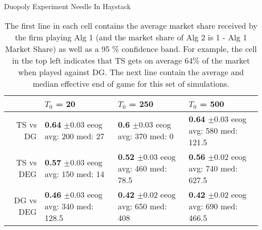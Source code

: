 \documentclass[../competing_bandits.tex]{subfiles}
\begin{document}
\begin{table}[ht]
\centering
\caption{Duopoly Experiment Needle In Haystack}
\begin{tabular}{rlll}
  \hline
 & $T_0$ = 20 & $T_0$ = 250 & $T_0$ = 500 \\
  \hline
TS vs DG & \makecell{\textbf{0.64} $\pm$0.03\\ eeog \\ avg: 200\\ med: 27} & \makecell{\textbf{0.6} $\pm$0.03\\ eeog \\ avg: 370\\ med: 0} & \makecell{\textbf{0.64} $\pm$0.03\\ eeog \\ avg: 580\\ med: 121.5} \\
  TS vs DEG & \makecell{\textbf{0.57} $\pm$0.03\\ eeog \\ avg: 150\\ med: 14} & \makecell{\textbf{0.52} $\pm$0.03\\ eeog \\ avg: 460\\ med: 78.5} & \makecell{\textbf{0.56} $\pm$0.02\\ eeog \\ avg: 740\\ med: 627.5} \\
  DG vs DEG & \makecell{\textbf{0.46} $\pm$0.03\\ eeog \\ avg: 340\\ med: 128.5} & \makecell{\textbf{0.42} $\pm$0.02\\ eeog \\ avg: 650\\ med: 408} & \makecell{\textbf{0.42} $\pm$0.02\\ eeog \\ avg: 690\\ med: 466.5} \\
   \hline
\end{tabular}
\label{sim_nih}
\caption*{\tiny{The first line in each cell contains the average market share received by the firm playing Alg 1 (and the market share of Alg 2 is 1 - Alg 1 Market Share) as well as a 95 \% confidence band. For example, the cell in the top left indicates that TS gets on average 64\% of the market when played against DG. The next line contain the average and median effective end of game for this set of simulations.}}
\end{table}
\end{document}
